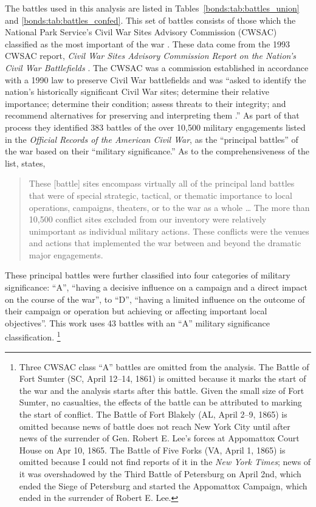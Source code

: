 The battles used in this analysis are listed in Tables~\ref{bonds:tab:battles_union} and \ref{bonds:tab:battles_confed}.
This set of battles consists of those which the National Park Service's Civil War Sites Advisory Commission (CWSAC) classified as the most important of the war \parencite{CWSAC1993}.
These data come from the 1993 CWSAC report, \textit{Civil War Sites Advisory Commission Report on the Nation's Civil War Battlefields} \parencites{CWSAC1993}{CWSAC1993b}.
The CWSAC was a commission established in accordance with a 1990 law to preserve Civil War battlefields and was ``asked to identify the nation's historically significant Civil War sites; determine their relative importance; determine their condition; assess threats to their integrity; and recommend alternatives for preserving and interpreting them \parencite{CWSAC1993b}.''
As part of that process they identified 383 battles of the over 10,500 military engagements listed in the \textit{Official Records of the American Civil War}, as the ``principal battles'' of the war based on their ``military significance.''
As to the comprehensiveness of the list, \textcite{CWSAC1993} states,
\begin{quote}
  These [battle] sites encompass virtually all of the principal land battles that were of special strategic, tactical, or thematic importance to local operations, campaigns, theaters, or to the war as a whole \dots{}
  The more than 10,500 conflict sites excluded from our inventory were relatively unimportant as individual military actions.
  These conflicts were the venues and actions that implemented the war between and beyond the dramatic major engagements.
\end{quote}
These principal battles were further classified into four categories of military significance: ``A'', ``having a decisive influence on a campaign and a direct impact on the course of the war'', to ``D'', ``having a limited influence on the outcome of their campaign or operation but achieving or affecting important local objectives''.
This work uses 43 battles with an ``A'' military significance classification.%
\footnote{
  Three CWSAC class ``A'' battles are omitted from the analysis.
  The Battle of Fort Sumter (SC, April 12--14, 1861) is omitted because it marks the start of the war and the analysis starts after this battle.
  Given the small size of Fort Sumter, no casualties, the effects of the battle can be attributed to marking the start of conflict.
  The Battle of Fort Blakely (AL, April 2--9, 1865) is omitted because news of battle does not reach New York City until after news of the surrender of Gen. Robert E. Lee's forces at Appomattox Court House on Apr 10, 1865.
  The Battle of Five Forks (VA, April 1, 1865) is omitted because I could not find reports of it in the \textit{New York Times}; news of it was overshadowed by the Third Battle of Petersburg on April 2nd, which ended the Siege of Petersburg and started the Appomattox Campaign, which ended in the surrender of Robert E. Lee.
}
